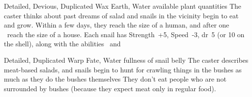   {Detailed, Devious, Duplicated}%
  {Wax}%
  {Earth, Water}%
  {available plant quantities}%
  {The caster thinks about past dreams of salad and  snails in the vicinity begin to eat and grow.
  Within a few days, they reach the size of a human, and after one \showOnset\ reach the size of a house.
  Each snail has Strength~+5, Speed~-3, \gls{dr}~5 (or 10 on the shell), along with the abilities \viscid\ and \acidSpray}%
  {}

  {Detailed, Duplicated}%
  {Warp}%
  {Fate, Water}%
  {fullness of snail belly}%
  {The caster describes meat-based salads, and  snails begin to hunt for crawling things in the bushes as much as they do the bushes themselves}%
  {They don't eat people who are not surrounded by bushes (because they expect meat only in regular food).}



